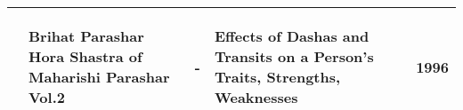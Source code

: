 \begin{tabularx}{\columnwidth}{|X|X|X|X|X|}
	\hline
	\begin{center}\cite{BrihatParasharHoraShastraVol2}\end{center} & \begin{center}Brihat Parashar Hora Shastra of Maharishi Parashar Vol.2\end{center} & \begin{center}-\end{center} & \begin{center}Effects of Dashas and Transits on a Person's Traits, Strengths, Weaknesses\end{center} & \begin{center}1996\end{center}\\
	\hline
\end{tabularx}


